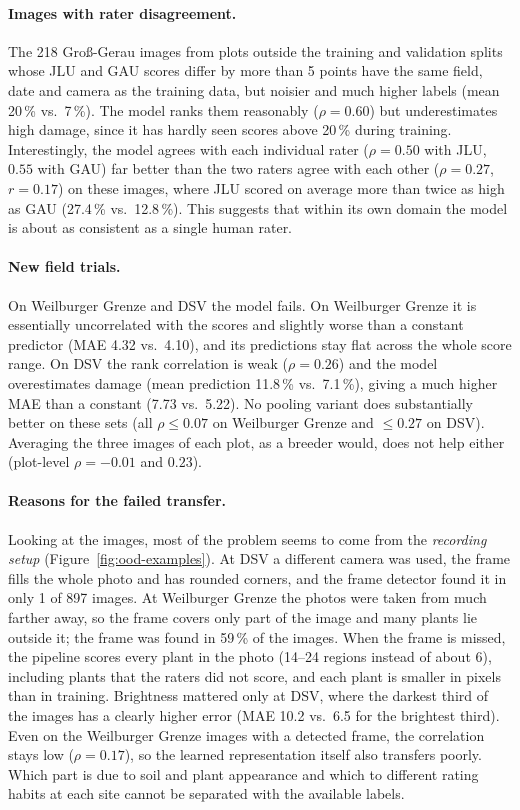 \paragraph{Images with rater disagreement.} The 218 Gro\ss-Gerau images from plots outside the
training and validation splits whose JLU and GAU scores differ by more than 5 points have the same
field, date and camera as the training data, but noisier and much higher labels (mean 20\,\% vs.\
7\,\%). The model ranks them reasonably ($\rho = 0.60$) but underestimates high damage, since it
has hardly seen scores above 20\,\% during training. Interestingly, the model agrees with each
individual rater ($\rho = 0.50$ with JLU, $0.55$ with GAU) far better than the two raters agree
with each other ($\rho = 0.27$, $r = 0.17$) on these images, where JLU scored on average more than twice as high as GAU (27.4\,\% vs.\ 12.8\,\%). This suggests that within its own domain
the model is about as consistent as a single human rater.

\paragraph{New field trials.} On Weilburger Grenze and DSV the model fails. On Weilburger Grenze it
is essentially uncorrelated with the scores and slightly worse than a constant predictor (MAE 4.32
vs.\ 4.10), and its predictions stay flat across the whole score range. On DSV the rank correlation
is weak ($\rho = 0.26$) and the model overestimates damage (mean prediction 11.8\,\% vs.\ 7.1\,\%),
giving a much higher MAE than a constant (7.73 vs.\ 5.22). No pooling variant does substantially
better on these sets (all $\rho \leq 0.07$ on Weilburger Grenze and $\leq 0.27$ on DSV). Averaging
the three images of each plot, as a breeder would, does not help either (plot-level
$\rho = -0.01$ and $0.23$).

\paragraph{Reasons for the failed transfer.} Looking at the images, most of the problem seems to come from the
\emph{recording setup} (Figure~\ref{fig:ood-examples}). At DSV a different
camera was used, the frame fills the whole photo and has rounded corners, and the frame detector
found it in only 1 of 897 images. At Weilburger Grenze the photos were taken from much farther
away, so the frame covers only part of the image and many plants lie outside it; the frame was
found in 59\,\% of the images. When the frame is missed, the pipeline scores every plant in the
photo (14--24 regions instead of about 6), including plants that the raters did not score, and
each plant is smaller in pixels than in training. Brightness mattered only at DSV, where the darkest third of the images has a clearly higher error (MAE 10.2 vs.\ 6.5 for the brightest third). Even on the Weilburger Grenze images with a detected frame, the correlation stays low
($\rho = 0.17$), so the learned representation itself also transfers poorly. Which part is due to
soil and plant appearance and which to different rating habits at each site cannot be separated
with the available labels.

